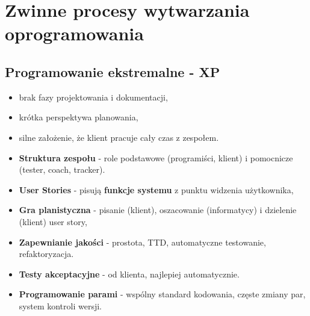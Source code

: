 \documentclass[a4paper]{article}
\begin{document}
    \section{Zwinne procesy wytwarzania oprogramowania}

    \subsection{Programowanie ekstremalne - XP}
    \begin{itemize}
        \item brak fazy projektowania i dokumentacji,
        \item krótka perspektywa planowania,
        \item silne założenie, że klient pracuje cały czas z zespołem.
    \end{itemize}



    \begin{itemize}
        \item \textbf{Struktura zespołu} - role podstawowe (programiści, klient) i pomocnicze
        (tester, coach, tracker).

        \item \textbf{User Stories} - pisują \textbf{funkcje systemu} z punktu widzenia użytkownika,

        \item \textbf{Gra planistyczna} - pisanie (klient), oszacowanie (informatycy) i dzielenie
        (klient) user story,

        \item \textbf{Zapewnianie jakości} - prostota, TTD, automatyczne testowanie, refaktoryzacja.

        \item \textbf{Testy akceptacyjne} - od klienta, najlepiej automatycznie.

        \item \textbf{Programowanie parami} - wspólny standard kodowania, częste zmiany par, system
        kontroli wersji.
    \end{itemize}
\end{document}
